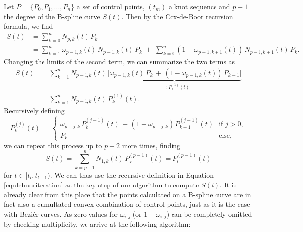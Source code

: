 \documentclass[a4paper, 11pt]{report}
\theoremstyle{definition}
\begin{document}
Let $P = \{P_0, P_1, ..., P_n\}$ a set of control points, $(t_m)$ a knot sequence and $p-1$ the degree of the B-spline curve $S(t)$. Then by the Cox-de-Boor recursion formula, we find
\begin{align*}
	S(t) 	&= \sum_{k=0}^n N_{p,k}(t) \, P_k \\
			&= \sum_{k=1}^n \omega_{p-1,k}(t) \, N_{p-1, k}(t) \, P_k  \; + \; \sum_{k=0}^n \left( 1-\omega_{p-1,k+1}(t) \right) \, N_{p-1, k+1}(t) \, P_k.
\end{align*}
Changing the limits of the second term, we can summarize the two terms as
\begin{align*} 
	S(t) 	&= \sum_{k=1}^n N_{p-1, k}(t) \, \underbrace{\Big[ \omega_{p-1,k}(t) \, P_k  \, + \, \left( 1-\omega_{p-1,k}(t) \right) \, P_{k-1} \Big]}_{=: P_k^{(1)}(t)} \\
			&= \sum_{k=1}^n N_{p-1, k}(t) \, P_k^{(1)}(t).
\end{align*}
Recursively defining
\begin{equation}\label{eq:debooriteration}
	P^{(j)}_k(t) := \begin{cases}
		\omega_{p-j, k} \, P^{(j-1)}_k(t) \, + \, (1-\omega_{p-j, k}) \, P^{(j-1)}_{k-1}(t) 	&\text{if } j > 0,\\
		P_k 																					&\text{else},
	\end{cases}
\end{equation}
we can repeat this process up to $p-2$ more times, finding
$$ S(t) = \sum_{k=p-1}^n N_{1, k}(t) \, P^{(p-1)}_k(t) = P^{(p-1)}_l(t)$$
for $t \in [t_l, t_{l+1})$. We can thus use the recursive definition in Equation \ref{eq:debooriteration} as the key step of our algorithm to compute $S(t)$. It is already clear from this place that the points calculated on a B-spline curve are in fact also a cumultated convex combination of control points, just as it is the case with Beziér curves. As zero-values for $\omega_{i,j}$ (or $1-\omega_{i,j}$) can be completely omitted by checking multiplicity, we arrive at the following algorithm:
\end{document}
